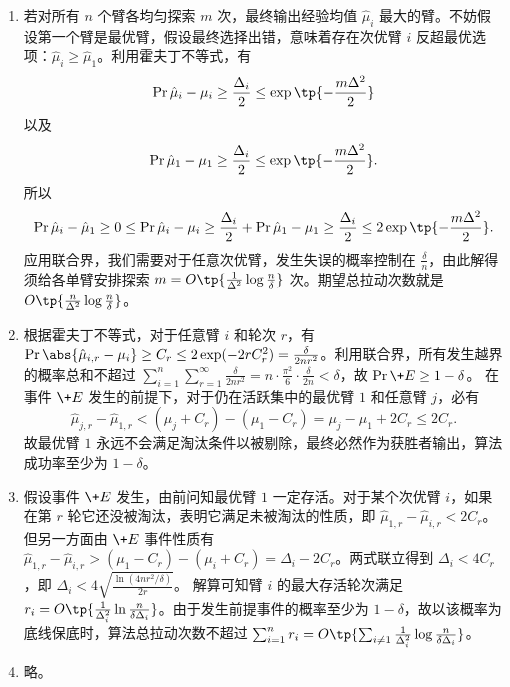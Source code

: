 \begin{solution}
    \begin{enumerate}
        \item 若对所有 $n$ 个臂各均匀探索 $m$ 次，最终输出经验均值 $\hat \mu_i$ 最大的臂。不妨假设第一个臂是最优臂，假设最终选择出错，意味着存在次优臂 $i$ 反超最优选项：$\hat{\mu}_i \ge \hat{\mu}_1$。利用霍夫丁不等式，有
        \[
            \Pr{\hat{\mu}_i - \mu_i\ge \frac{\Delta_i}{2}} \le \exp\tp{-\frac{m\Delta^2}{2}}
        \]
        以及
        \[
            \Pr{\hat{\mu}_1 - \mu_1\ge \frac{\Delta_i}{2}} \le \exp\tp{-\frac{m\Delta^2}{2}}.
        \]
        所以
        \[
            \Pr{\hat{\mu}_i - \hat{\mu}_1 \ge 0} \leq \Pr{\hat{\mu}_i - \mu_i\ge \frac{\Delta_i}{2}} +  \Pr{\hat{\mu}_1 - \mu_1\ge \frac{\Delta_i}{2}} \le 2\exp\tp{-\frac{m\Delta^2}{2}}.
        \]
        应用联合界，我们需要对于任意次优臂，发生失误的概率控制在 $\frac{\delta}{n}$，由此解得须给各单臂安排探索 $m = O\tp{\frac{1}{\Delta^2}\log\frac{n}{\delta}}$ 次。期望总拉动次数就是 $O\tp{\frac{n}{\Delta^2}\log\frac{n}{\delta}}$。
        \item 根据霍夫丁不等式，对于任意臂 $i$ 和轮次 $r$，有 $\Pr{\abs{\hat{\mu}_{i,r} - \mu_i} \ge C_r} \le 2\exp(-2r C_r^2) = \frac{\delta}{2n r^2}$。利用联合界，所有发生越界的概率总和不超过 $\sum_{i=1}^n \sum_{r=1}^\infty \frac{\delta}{2n r^2} = n \cdot \frac{\pi^2}{6} \cdot \frac{\delta}{2n} < \delta$，故 $\Pr{\+E} \ge 1-\delta$。
        在事件 $\+E$ 发生的前提下，对于仍在活跃集中的最优臂 $1$ 和任意臂 $j$，必有 \[
            \hat{\mu}_{j,r} - \hat{\mu}_{1,r} < (\mu_j + C_r) - (\mu_1 - C_r) = \mu_j - \mu_1 + 2C_r \le 2C_r.
        \]
        故最优臂 $1$ 永远不会满足淘汰条件以被剔除，最终必然作为获胜者输出，算法成功率至少为 $1-\delta$。
        \item 假设事件 $\+E$ 发生，由前问知最优臂 $1$ 一定存活。对于某个次优臂 $i$，如果在第 $r$ 轮它还没被淘汰，表明它满足未被淘汰的性质，即 $\hat{\mu}_{1,r} - \hat{\mu}_{i,r} < 2C_r$。
        但另一方面由 $\+E$ 事件性质有 $\hat{\mu}_{1,r} - \hat{\mu}_{i,r} > (\mu_1 - C_r) - (\mu_i + C_r) = \Delta_i - 2C_r$。两式联立得到 $\Delta_i < 4C_r$，即 $\Delta_i < 4\sqrt{\frac{\ln(4n r^2 / \delta)}{2r}}$。
        解算可知臂 $i$ 的最大存活轮次满足 $r_i = O\tp{\frac{1}{\Delta_i^2}\ln\frac{n}{\delta\Delta_i}}$。由于发生前提事件的概率至少为 $1-\delta$，故以该概率为底线保底时，算法总拉动次数不超过 $\sum_{i=1}^n r_i = O\tp{\sum_{i\neq 1}\frac{1}{\Delta_i^2}\log\frac{n}{\delta\Delta_i}}$。
        \item 略。
    \end{enumerate}
\end{solution}


